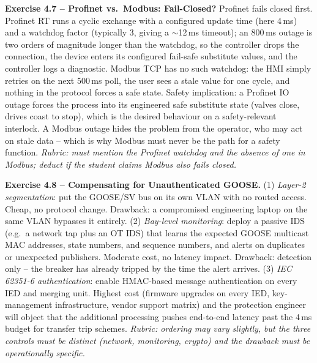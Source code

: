 \documentclass[11pt,a4paper]{article}
\begin{document}
\begin{solutionbox}
\textbf{Exercise 4.7 -- Profinet vs.\ Modbus: Fail-Closed?}
Profinet fails closed first. Profinet RT runs a cyclic exchange with a
configured update time (here 4\,ms) and a watchdog factor (typically 3,
giving a $\sim$12\,ms timeout); an 800\,ms outage is two orders of magnitude
longer than the watchdog, so the controller drops the connection, the
device enters its configured fail-safe substitute values, and the
controller logs a diagnostic. Modbus TCP has no such watchdog: the HMI
simply retries on the next 500\,ms poll, the user sees a stale value for
one cycle, and nothing in the protocol forces a safe state.
Safety implication: a Profinet IO outage forces the process into its
engineered safe substitute state (valves close, drives coast to stop),
which is the desired behaviour on a safety-relevant interlock. A Modbus
outage hides the problem from the operator, who may act on stale data --
which is why Modbus must never be the path for a safety function.
\textit{Rubric: must mention the Profinet watchdog and the absence of one
in Modbus; deduct if the student claims Modbus also fails closed.}
\end{solutionbox}

\begin{solutionbox}
\textbf{Exercise 4.8 -- Compensating for Unauthenticated GOOSE.}
(1) \emph{Layer-2 segmentation}: put the GOOSE/SV bus on its own VLAN with
no routed access. Cheap, no protocol change. Drawback: a compromised
engineering laptop on the same VLAN bypasses it entirely.
(2) \emph{Bay-level monitoring}: deploy a passive IDS (e.g.\ a network tap
plus an OT IDS) that learns the expected GOOSE multicast MAC addresses,
state numbers, and sequence numbers, and alerts on duplicates or
unexpected publishers. Moderate cost, no latency impact. Drawback:
detection only -- the breaker has already tripped by the time the alert
arrives.
(3) \emph{IEC 62351-6 authentication}: enable HMAC-based message
authentication on every IED and merging unit. Highest cost (firmware
upgrades on every IED, key-management infrastructure, vendor support
matrix) and the protection engineer will object that the additional
processing pushes end-to-end latency past the 4\,ms budget for transfer
trip schemes.
\textit{Rubric: ordering may vary slightly, but the three controls must be
distinct (network, monitoring, crypto) and the drawback must be
operationally specific.}
\end{solutionbox}
\end{document}
